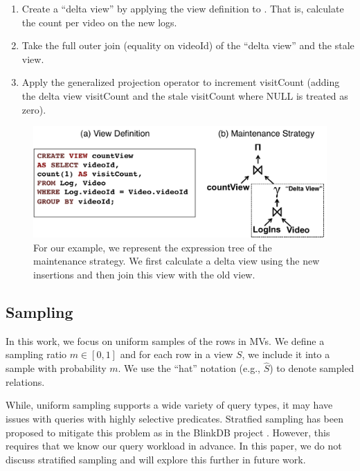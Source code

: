 \vspace{-.45em}
\begin{enumerate}[noitemsep]
\item Create a ``delta view'' by applying the view definition to . That is, calculate the count per video on the new logs.
\item Take the full outer join (equality on \textsf{videoId}) of the ``delta view'' and the stale view.
\item Apply the generalized projection operator to increment \textsf{visitCount} (adding the delta view \textsf{visitCount}  and the stale \textsf{visitCount} where NULL is treated as zero).
\end{enumerate}
\vspace{-.5em}

\begin{figure}[t] \vspace{-2em}
\centering
 \includegraphics[scale=0.32]{figs/example_expression_tree.pdf} \vspace{-.5em}
 \caption{For our example, we represent the expression tree of the maintenance strategy. We first calculate a delta view using the new insertions and then join this view with the old view.\label{exexpr}}\vspace{-1.5em}
\end{figure}

\subsection{Sampling}
In this work, we focus on uniform samples of the rows in MVs.
We define a sampling ratio $m\in [0,1]$ and for each row in a view $S$, we include it into a sample with probability $m$.
We use the ``hat'' notation (e.g., $\hat{S}$) to denote sampled relations. 

While, uniform sampling supports a wide variety of query types, it may have issues with queries with highly selective predicates.
Stratfied sampling has been proposed to mitigate this problem as in the BlinkDB project \cite{AgarwalMPMMS13}.
However, this requires that we know our query workload in advance.  
In this paper, we do not discuss stratified sampling and will explore this further in future work.

